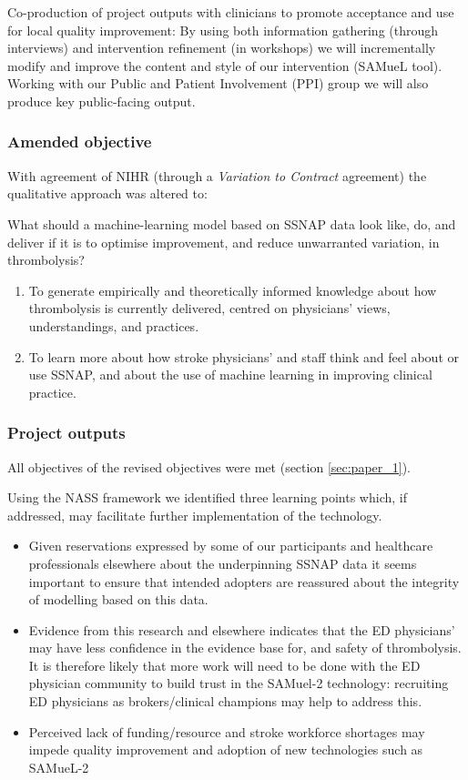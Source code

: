 Co-production of project outputs with clinicians to promote acceptance and use for local quality improvement: By using both information gathering (through interviews) and intervention refinement (in workshops) we will incrementally modify and improve the content and style of our intervention (SAMueL tool). Working with our Public and Patient Involvement (PPI) group we will also produce key public-facing output.

\subsubsection*{Amended objective}

With agreement of NIHR (through a \textit{Variation to Contract} agreement) the qualitative approach was altered to:

What should a machine-learning model based on SSNAP data look like, do, and deliver if it is to optimise improvement, and reduce unwarranted variation, in thrombolysis?

\begin{enumerate}
    \item To generate empirically and theoretically informed knowledge about how thrombolysis is currently delivered, centred on physicians’ views, understandings, and practices.
    \item To learn more about how stroke physicians’ and staff think and feel about or use SSNAP, and about the use of machine learning in improving clinical practice.
\end{enumerate}


\subsubsection*{Project outputs}

All objectives of the revised objectives were met (section \ref{sec:paper_1}).

Using the NASS framework we identified three learning points which, if addressed, may facilitate further implementation of the technology. 

\begin{itemize}
    \item Given reservations expressed by some of our participants and healthcare professionals elsewhere about the underpinning SSNAP data it seems important to ensure that intended adopters are reassured about the integrity of modelling based on this data.
    \item Evidence from this research and elsewhere indicates that the ED physicians’ may have less confidence in the evidence base for, and safety of thrombolysis. It is therefore likely that more work will need to be done with the ED physician community to build trust in the SAMuel-2 technology: recruiting ED physicians as brokers/clinical champions may help to address this.
    \item Perceived lack of funding/resource and stroke workforce shortages may impede quality improvement and adoption of new technologies such as SAMueL-2
\end{itemize}